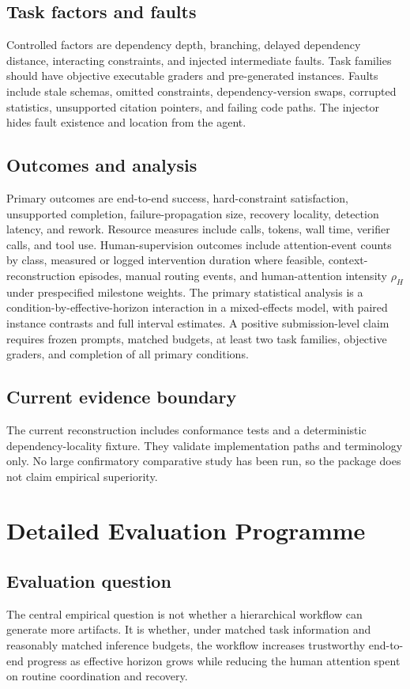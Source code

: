 \documentclass[11pt,a4paper]{article}
\begin{document}
\subsection{Task factors and faults}
Controlled factors are dependency depth, branching, delayed dependency distance, interacting constraints, and injected intermediate faults. Task families should have objective executable graders and pre-generated instances. Faults include stale schemas, omitted constraints, dependency-version swaps, corrupted statistics, unsupported citation pointers, and failing code paths. The injector hides fault existence and location from the agent.

\subsection{Outcomes and analysis}
Primary outcomes are end-to-end success, hard-constraint satisfaction, unsupported completion, failure-propagation size, recovery locality, detection latency, and rework. Resource measures include calls, tokens, wall time, verifier calls, and tool use. Human-supervision outcomes include attention-event counts by class, measured or logged intervention duration where feasible, context-reconstruction episodes, manual routing events, and human-attention intensity $\rho_H$ under prespecified milestone weights. The primary statistical analysis is a condition-by-effective-horizon interaction in a mixed-effects model, with paired instance contrasts and full interval estimates. A positive submission-level claim requires frozen prompts, matched budgets, at least two task families, objective graders, and completion of all primary conditions.

\subsection{Current evidence boundary}
The current reconstruction includes conformance tests and a deterministic dependency-locality fixture. They validate implementation paths and terminology only. No large confirmatory comparative study has been run, so the package does not claim empirical superiority.



\section{Detailed Evaluation Programme}\label{sec:detailed-eval}
\subsection{Evaluation question}
The central empirical question is not whether a hierarchical workflow can generate more artifacts. It is whether, under matched task information and reasonably matched inference budgets, the workflow increases trustworthy end-to-end progress as effective horizon grows while reducing the human attention spent on routine coordination and recovery.
\end{document}
